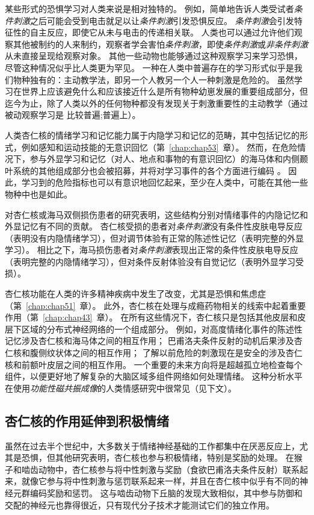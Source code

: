 某些形式的恐惧学习对人类来说是相对独特的。
例如，简单地告诉人类受试者\textit{条件刺激}之后可能会受到电击就足以让\textit{条件刺激}引发恐惧反应。
\textit{条件刺激}会引发特征性的自主反应，即使它从未与电击的传递相关联。
人类也可以通过允许他们观察其他被制约的人来制约，观察者学会害怕\textit{条件刺激}，即使\textit{条件刺激}或\textit{非条件刺激}从未直接呈现给观察对象。
其他一些动物也能够通过这种观察学习来学习恐惧，尽管这种情况似乎比人类更为罕见。
一种在人类中普遍存在的学习形式似乎是我们物种独有的：主动教学法，即另一个人教另一个人一种刺激是危险的。
虽然学习在世界上应该避免什么和应该接近什么是所有物种幼崽发展的重要组成部分，但迄今为止，除了人类以外的任何物种都没有发现关于刺激重要性的主动教学（通过被动观察学习是 比较普遍;普遍上）。


人类杏仁核的情绪学习和记忆能力属于内隐学习和记忆的范畴，其中包括记忆的形式，例如感知和运动技能的无意识回忆（第~\ref{chap:chap53}~章）。
然而，在危险情况下，参与外显学习和记忆（对人、地点和事物的有意识回忆）的海马体和内侧颞叶系统的其他组成部分也会被招募，并将对学习事件的各个方面进行编码 。
因此，学习到的危险指标也可以有意识地回忆起来，至少在人类中，可能在其他一些物种中也是如此。


对杏仁核或海马双侧损伤患者的研究表明，这些结构分别对情绪事件的内隐记忆和外显记忆有不同的贡献。
杏仁核受损的患者对\textit{条件刺激}没有条件性皮肤电导反应（表明没有内隐情绪学习），但对调节体验有正常的陈述性记忆（表明完整的外显学习）。
相比之下，海马损伤患者对\textit{条件刺激}表现出正常的条件性皮肤电导反应（表明完整的内隐情绪学习），但对条件反射体验没有自觉记忆（表明外显学习受损）。


杏仁核功能在人类的许多精神疾病中发生了改变，尤其是恐惧和焦虑症（第~\ref{chap:chap51}~章）。
此外，杏仁核在处理与成瘾药物相关的线索中起着重要作用（第~\ref{chap:chap43}~章）。
在所有这些情况下，杏仁核只是包括其他皮层和皮层下区域的分布式神经网络的一个组成部分。
例如，对高度情绪化事件的陈述性记忆涉及杏仁核和海马体之间的相互作用；
巴甫洛夫条件反射的动机后果涉及杏仁核和腹侧纹状体之间的相互作用；
了解以前危险的刺激现在是安全的涉及杏仁核和前额叶皮层之间的相互作用。
一个重要的未来方向将是超越孤立地检查每个组件，以便更好地了解复杂的大脑区域多组件网络如何处理情绪。
这种分析水平在使用\textit{功能性磁共振成像}的人类情感研究中很常见（见下文）。



\subsection{杏仁核的作用延伸到积极情绪}

虽然在过去半个世纪中，大多数关于情绪神经基础的工作都集中在厌恶反应上，尤其是恐惧，但其他研究表明，杏仁核也参与积极情绪，特别是奖励的处理。
在猴子和啮齿动物中，杏仁核参与将中性刺激与奖励（食欲巴甫洛夫条件反射）联系起来，就像它参与将中性刺激与惩罚联系起来一样，并且在杏仁核中似乎有不同的神经元群编码奖励和惩罚。
这与啮齿动物下丘脑的发现大致相似，其中参与防御和交配的神经元也靠得很近，只有现代分子技术才能测试它们的独立作用。


